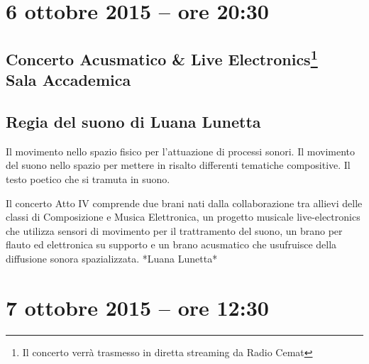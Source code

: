 \documentclass[8pt, twoside, a5paper]{extreport}
\begin{document}
\bigskip

\begin{multicols}{2}




\end{multicols}

\clearpage

\section*{6 ottobre 2015 -- ore 20:30}

\subsection*{{\small Concerto Acusmatico \& Live Electronics\footnote{ Il concerto verrà trasmesso in diretta streaming da Radio Cemat}} \\
	\textsf{Sala Accademica}}

{\fontsize{30}{30} }

\subsection*{\textsf{Regia del suono di Luana Lunetta}}

Il movimento nello spazio fisico per l'attuazione di processi sonori.
Il movimento del suono nello spazio per mettere in risalto differenti tematiche compositive.
Il testo poetico che si tramuta in suono.

Il concerto Atto IV comprende due brani nati dalla collaborazione tra allievi delle classi di Composizione e Musica Elettronica, un progetto musicale live-electronics che utilizza sensori di movimento per il trattramento del suono, un brano per flauto ed elettronica su supporto e un brano acusmatico che usufruisce della diffusione sonora spazializzata.     
*Luana Lunetta*


\begin{multicols}{2}




\end{multicols}

\clearpage


\section*{7 ottobre 2015 -- ore 12:30}
\end{document}
